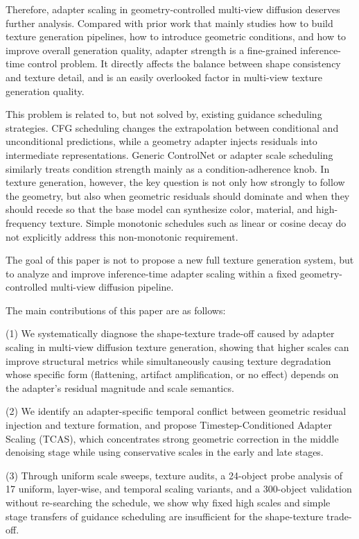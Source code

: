 \documentclass[times,twocolumn,final]{elsarticle}
\begin{document}
Therefore, adapter scaling in geometry-controlled multi-view diffusion deserves further analysis. Compared with prior work that mainly studies how to build texture generation pipelines, how to introduce geometric conditions, and how to improve overall generation quality, adapter strength is a fine-grained inference-time control problem. It directly affects the balance between shape consistency and texture detail, and is an easily overlooked factor in multi-view texture generation quality.

This problem is related to, but not solved by, existing guidance scheduling strategies. CFG scheduling changes the extrapolation between conditional and unconditional predictions, while a geometry adapter injects residuals into intermediate representations. Generic ControlNet or adapter scale scheduling similarly treats condition strength mainly as a condition-adherence knob. In texture generation, however, the key question is not only how strongly to follow the geometry, but also when geometric residuals should dominate and when they should recede so that the base model can synthesize color, material, and high-frequency texture. Simple monotonic schedules such as linear or cosine decay do not explicitly address this non-monotonic requirement.

The goal of this paper is not to propose a new full texture generation system, but to analyze and improve inference-time adapter scaling within a fixed geometry-controlled multi-view diffusion pipeline.

The main contributions of this paper are as follows:

(1) We systematically diagnose the shape-texture trade-off caused by adapter scaling in multi-view diffusion texture generation, showing that higher scales can improve structural metrics while simultaneously causing texture degradation whose specific form (flattening, artifact amplification, or no effect) depends on the adapter's residual magnitude and scale semantics.

(2) We identify an adapter-specific temporal conflict between geometric residual injection and texture formation, and propose Timestep-Conditioned Adapter Scaling (TCAS), which concentrates strong geometric correction in the middle denoising stage while using conservative scales in the early and late stages.

(3) Through uniform scale sweeps, texture audits, a 24-object probe analysis of 17 uniform, layer-wise, and temporal scaling variants, and a 300-object validation without re-searching the schedule, we show why fixed high scales and simple stage transfers of guidance scheduling are insufficient for the shape-texture trade-off.
\end{document}
